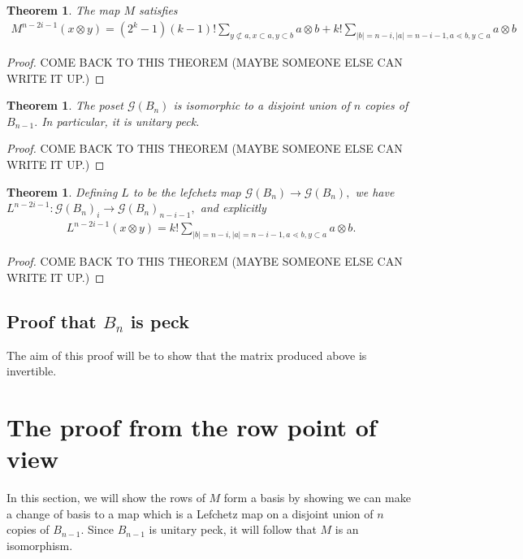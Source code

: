 \documentclass{amsart}
\newtheorem{thm}[subsubsection]{Theorem}
\newcommand\ssec{\subsection}
\begin{document}
\begin{thm}
The map $M$ satisfies 
\begin{align*}
	M^{n-2i-1}(x\otimes y) =(2^k - 1)(k-1)! \sum_{y \not \subset a,x\subset a,y \subset b}^{}a \otimes b + k!\sum_{|b| = n-i,|a| = n-i-1,a \lessdot b,y \subset a}^{}a \otimes b
\end{align*}
\end{thm}
\begin{proof}
COME BACK TO THIS THEOREM (MAYBE SOMEONE ELSE CAN WRITE IT UP.)
\end{proof}

\begin{thm}
\label{gbn_decomposition}
The poset $\mathcal G(B_n)$ is isomorphic to a disjoint union of $n$ copies of $B_{n-1}.$ In particular, it is unitary peck.
\end{thm}
\begin{proof}

COME BACK TO THIS THEOREM (MAYBE SOMEONE ELSE CAN WRITE IT UP.)
\end{proof}

\begin{thm}
\label{explicit_gbn_lefchetz}
Defining $L$ to be the lefchetz map $\mathcal G(B_n) \rightarrow \mathcal G(B_n),$ we have $L^{n-2i-1}:\mathcal G(B_n)_i \rightarrow \mathcal G(B_n)_{n-i-1},$ and explicitly 
\begin{align*}
	L^{n-2i-1}(x\otimes y)= k!\sum_{|b| = n-i,|a| = n-i-1,a \lessdot b,y \subset a}^{}a \otimes b.
\end{align*}
\end{thm}
\begin{proof}
COME BACK TO THIS THEOREM (MAYBE SOMEONE ELSE CAN WRITE IT UP.)
\end{proof}



\ssec{Proof that $B_n$ is peck}

The aim of this proof will be to show that the matrix produced above is invertible.

\section{The proof from the row point of view}

In this section, we will show the rows of $M$ form a basis by showing we can make a change of basis to a map which is a Lefchetz map on a disjoint union of $n$ copies of $B_{n-1}.$ Since $B_{n-1}$ is unitary peck, it will follow that $M$ is an isomorphism.
\end{document}
